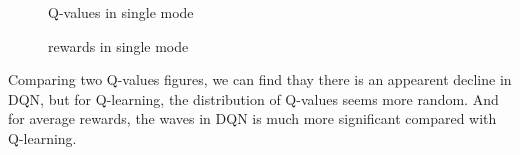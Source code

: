 \documentclass[12pt]{article}
\begin{document}
\begin{figure}[htbp]
	\centering
	\caption{Q-values in single mode}
\end{figure}
\begin{figure}[htbp]
	\centering
	\caption{rewards in single mode}
\end{figure}

Comparing two Q-values figures, we can find thay there is an appearent decline in DQN, but for Q-learning, the distribution of Q-values seems more random. And for average rewards, the waves in DQN is much more significant compared with Q-learning.
\end{document}

